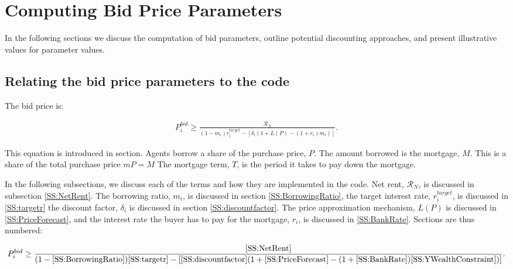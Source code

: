 \chapter[Parameters]{Computing Bid Price Parameters}
\label{AppendixParemeters}

In the following sections we discuss the computation of bid parameters, outline potential discounting approaches, and present illustrative values for parameter values.

\section{Relating the bid price parameters to the code}
The bid price is: 
 
\begin{align}
P_i^{bid} \ge   \frac{ \mathcal{R}_N}{(1-m_i)r_i^{target}-\left[ \delta_i(1+L(P)- (1+ r_i)m_i)\right]}. 
\end{align}

This equation is introduced in section. 
Agents borrow a share of the purchase price, $P$. The amount borrowed is the mortgage, $M$. This is a share of the total purchase price $mP = M$
The \gls{mortgage term}, $T$, is the period it takes to pay down the mortgage.

In the following subsections, we discuss each of the terms and how they are implemented in the code. Net rent, $\mathcal{R}_N$, is discussed in subsection \ref{SS:NetRent}. The borrowing ratio, $m_i$, is discussed in section \ref{SS:BorrowingRatio}, the target interest rate, $r_i^{target}$, is discussed in \ref{SS:targetr} the discount factor, $\delta_i$ is discussed in section \ref{SS:discountfactor}. The price approximation mechanism, $L(P)$ is discussed in \ref{SS:PriceForecast}, and the interest rate the buyer has to pay for the mortgage, $r_i$, is discussed in \ref{SS:BankRate}. Sections are thus numbered: 

\begin{align*}
P_i^{bid} \ge   \frac{\ref{SS:NetRent}} {(1-\ref{SS:BorrowingRatio})\ref{SS:targetr}-
\left[ \ref{SS:discountfactor}(1+\ref{SS:PriceForecast}- (1+\ref{SS:BankRate})\ref{SS:YWealthConstraint})\right]}. 
\end{align*}




